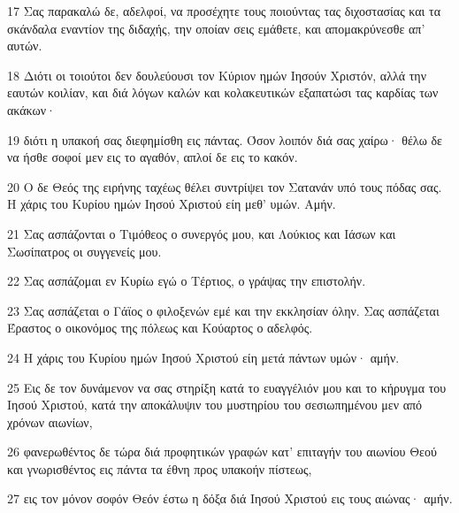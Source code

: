 \par 17 Σας παρακαλώ δε, αδελφοί, να προσέχητε τους ποιούντας τας διχοστασίας και τα σκάνδαλα εναντίον της διδαχής, την οποίαν σεις εμάθετε, και απομακρύνεσθε απ' αυτών.
\par 18 Διότι οι τοιούτοι δεν δουλεύουσι τον Κύριον ημών Ιησούν Χριστόν, αλλά την εαυτών κοιλίαν, και διά λόγων καλών και κολακευτικών εξαπατώσι τας καρδίας των ακάκων·
\par 19 διότι η υπακοή σας διεφημίσθη εις πάντας. Όσον λοιπόν διά σας χαίρω· θέλω δε να ήσθε σοφοί μεν εις το αγαθόν, απλοί δε εις το κακόν.
\par 20 Ο δε Θεός της ειρήνης ταχέως θέλει συντρίψει τον Σατανάν υπό τους πόδας σας. Η χάρις του Κυρίου ημών Ιησού Χριστού είη μεθ' υμών. Αμήν.
\par 21 Σας ασπάζονται ο Τιμόθεος ο συνεργός μου, και Λούκιος και Ιάσων και Σωσίπατρος οι συγγενείς μου.
\par 22 Σας ασπάζομαι εν Κυρίω εγώ ο Τέρτιος, ο γράψας την επιστολήν.
\par 23 Σας ασπάζεται ο Γάϊος ο φιλοξενών εμέ και την εκκλησίαν όλην. Σας ασπάζεται Έραστος ο οικονόμος της πόλεως και Κούαρτος ο αδελφός.
\par 24 Η χάρις του Κυρίου ημών Ιησού Χριστού είη μετά πάντων υμών· αμήν.
\par 25 Εις δε τον δυνάμενον να σας στηρίξη κατά το ευαγγέλιόν μου και το κήρυγμα του Ιησού Χριστού, κατά την αποκάλυψιν του μυστηρίου του σεσιωπημένου μεν από χρόνων αιωνίων,
\par 26 φανερωθέντος δε τώρα διά προφητικών γραφών κατ' επιταγήν του αιωνίου Θεού και γνωρισθέντος εις πάντα τα έθνη προς υπακοήν πίστεως,
\par 27 εις τον μόνον σοφόν Θεόν έστω η δόξα διά Ιησού Χριστού εις τους αιώνας· αμήν.


